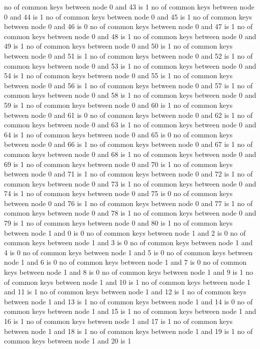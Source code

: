 no of common keys between node 0 and 43 is 1
no of common keys between node 0 and 44 is 1
no of common keys between node 0 and 45 is 1
no of common keys between node 0 and 46 is 0
no of common keys between node 0 and 47 is 1
no of common keys between node 0 and 48 is 1
no of common keys between node 0 and 49 is 1
no of common keys between node 0 and 50 is 1
no of common keys between node 0 and 51 is 1
no of common keys between node 0 and 52 is 1
no of common keys between node 0 and 53 is 1
no of common keys between node 0 and 54 is 1
no of common keys between node 0 and 55 is 1
no of common keys between node 0 and 56 is 1
no of common keys between node 0 and 57 is 1
no of common keys between node 0 and 58 is 1
no of common keys between node 0 and 59 is 1
no of common keys between node 0 and 60 is 1
no of common keys between node 0 and 61 is 0
no of common keys between node 0 and 62 is 1
no of common keys between node 0 and 63 is 1
no of common keys between node 0 and 64 is 1
no of common keys between node 0 and 65 is 0
no of common keys between node 0 and 66 is 1
no of common keys between node 0 and 67 is 1
no of common keys between node 0 and 68 is 1
no of common keys between node 0 and 69 is 1
no of common keys between node 0 and 70 is 1
no of common keys between node 0 and 71 is 1
no of common keys between node 0 and 72 is 1
no of common keys between node 0 and 73 is 1
no of common keys between node 0 and 74 is 1
no of common keys between node 0 and 75 is 0
no of common keys between node 0 and 76 is 1
no of common keys between node 0 and 77 is 1
no of common keys between node 0 and 78 is 1
no of common keys between node 0 and 79 is 1
no of common keys between node 0 and 80 is 1
no of common keys between node 1 and 0 is 0
no of common keys between node 1 and 2 is 0
no of common keys between node 1 and 3 is 0
no of common keys between node 1 and 4 is 0
no of common keys between node 1 and 5 is 0
no of common keys between node 1 and 6 is 0
no of common keys between node 1 and 7 is 0
no of common keys between node 1 and 8 is 0
no of common keys between node 1 and 9 is 1
no of common keys between node 1 and 10 is 1
no of common keys between node 1 and 11 is 1
no of common keys between node 1 and 12 is 1
no of common keys between node 1 and 13 is 1
no of common keys between node 1 and 14 is 0
no of common keys between node 1 and 15 is 1
no of common keys between node 1 and 16 is 1
no of common keys between node 1 and 17 is 1
no of common keys between node 1 and 18 is 1
no of common keys between node 1 and 19 is 1
no of common keys between node 1 and 20 is 1
